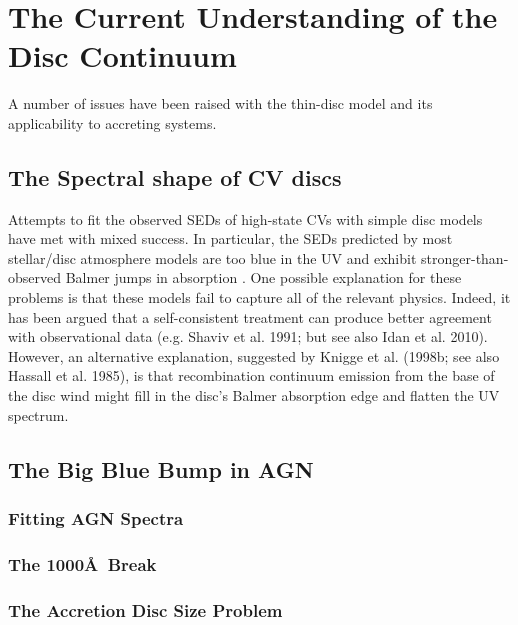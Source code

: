 \section{The Current Understanding of the Disc Continuum}

\label{sec:disc_continuum}

A number of issues have been raised with the thin-disc model and
its applicability to accreting systems. 

\subsection{The Spectral shape of CV discs}

Attempts to fit the observed SEDs of high-state CVs with simple disc models 
have met with mixed success. In
particular, the SEDs predicted by most stellar/disc atmosphere models 
are too blue in the UV \citep{wade1988,long1991,long1994,knigge1998} and exhibit
stronger-than-observed Balmer jumps in absorption 
\citep{wade1984,haug1987,ladous1989b,knigge1998}. One possible
explanation for these problems is that these models fail to capture
all of the relevant physics. Indeed, it has been argued that a
self-consistent treatment can produce better agreement with 
observational data (e.g. Shaviv et al. 1991;  but see also Idan et al. 2010).
\nocite{idanshaviv2010} \nocite{shaviv1991}
However, an alternative explanation, suggested by Knigge et al.
(1998b; see also Hassall et al. 1985)\nocite{KLWB98,hassall}, 
is that recombination continuum emission from the base of the 
disc wind might fill in the disc's Balmer absorption edge and flatten the UV spectrum.

\subsection{The Big Blue Bump in AGN}

\subsubsection{Fitting AGN Spectra}

\subsubsection{The 1000\AA\ Break}

\subsubsection{The Accretion Disc Size Problem}

